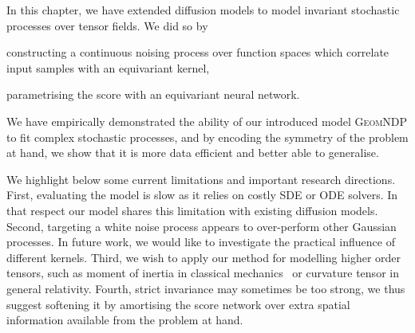 In this chapter, we have extended diffusion models to model invariant stochastic processes over tensor fields.
We did so by \begin{enumerate*}[label=(\alph*)] \item constructing a continuous noising process over function spaces which correlate input samples with an equivariant kernel, \item parametrising the score with an equivariant neural network.
\end{enumerate*}
We have empirically demonstrated the ability of our introduced model {\scshape GeomNDP } to fit complex stochastic processes, and by encoding the symmetry of the problem at hand, we show that it is more data efficient and better able to generalise.

We highlight below some current limitations and important research directions.
First, evaluating the model is slow as it relies on costly SDE or ODE solvers.
In that respect our model shares this limitation with existing diffusion models.
Second, targeting a white noise process appears to over-perform other Gaussian processes.
In future work, we would like to investigate the practical influence of different kernels.
Third, we wish to apply our method for modelling higher order tensors, such as moment of inertia in classical mechanics~\parencite{thomas2018tensor} or curvature tensor in general relativity.
Fourth, strict invariance may sometimes be too strong, we thus suggest softening it by amortising the score network over extra spatial information available from the problem at hand.
